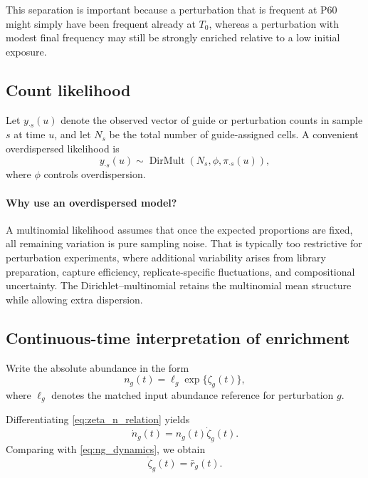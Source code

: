 \documentclass[11pt]{article}
\newcommand{\1}{\mathbf{1}}
\newcommand{\Tzero}{T_0}
\newcommand{\Psixty}{\mathrm{P60}}
\DeclareMathOperator{\DirMult}{DirMult}
\theoremstyle{plain}
\begin{document}
This separation is important because a perturbation that is frequent at $\Psixty$ might simply have been frequent already at $\Tzero$, whereas a perturbation with modest final frequency may still be strongly enriched relative to a low initial exposure.

\subsection{Count likelihood}

Let $y_{\cdot s}(u)$ denote the observed vector of guide or perturbation counts in sample $s$ at time $u$, and let $N_s$ be the total number of guide-assigned cells. A convenient overdispersed likelihood is
\begin{equation}
 y_{\cdot s}(u) \sim \DirMult\!\left(N_s,\phi,\pi_{\cdot s}(u)\right),
 \label{eq:dirichlet_multinomial}
\end{equation}
where $\phi$ controls overdispersion.

\paragraph{Why use an overdispersed model?}
A multinomial likelihood assumes that once the expected proportions are fixed, all remaining variation is pure sampling noise. That is typically too restrictive for perturbation experiments, where additional variability arises from library preparation, capture efficiency, replicate-specific fluctuations, and compositional uncertainty. The Dirichlet--multinomial retains the multinomial mean structure while allowing extra dispersion.

\subsection{Continuous-time interpretation of enrichment}

Write the absolute abundance in the form
\begin{equation}
 n_g(t)=\ell_g\exp\{\zeta_g(t)\},
 \label{eq:zeta_n_relation}
\end{equation}
where $\ell_g$ denotes the matched input abundance reference for perturbation $g$.

Differentiating \eqref{eq:zeta_n_relation} yields
\[
\dot n_g(t)=n_g(t)\dot\zeta_g(t).
\]
Comparing with \eqref{eq:ng_dynamics}, we obtain
\begin{equation}
\dot\zeta_g(t)=\bar r_g(t).
\label{eq:zeta_dot}
\end{equation}
\end{document}
